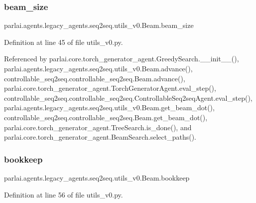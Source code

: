 \subsubsection{\texorpdfstring{beam\+\_\+size}{beam\_size}}
{\footnotesize\ttfamily parlai.\+agents.\+legacy\+\_\+agents.\+seq2seq.\+utils\+\_\+v0.\+Beam.\+beam\+\_\+size}



Definition at line 45 of file utils\+\_\+v0.\+py.



Referenced by parlai.\+core.\+torch\+\_\+generator\+\_\+agent.\+Greedy\+Search.\+\_\+\+\_\+init\+\_\+\+\_\+(), parlai.\+agents.\+legacy\+\_\+agents.\+seq2seq.\+utils\+\_\+v0.\+Beam.\+advance(), controllable\+\_\+seq2seq.\+controllable\+\_\+seq2seq.\+Beam.\+advance(), parlai.\+core.\+torch\+\_\+generator\+\_\+agent.\+Torch\+Generator\+Agent.\+eval\+\_\+step(), controllable\+\_\+seq2seq.\+controllable\+\_\+seq2seq.\+Controllable\+Seq2seq\+Agent.\+eval\+\_\+step(), parlai.\+agents.\+legacy\+\_\+agents.\+seq2seq.\+utils\+\_\+v0.\+Beam.\+get\+\_\+beam\+\_\+dot(), controllable\+\_\+seq2seq.\+controllable\+\_\+seq2seq.\+Beam.\+get\+\_\+beam\+\_\+dot(), parlai.\+core.\+torch\+\_\+generator\+\_\+agent.\+Tree\+Search.\+is\+\_\+done(), and parlai.\+core.\+torch\+\_\+generator\+\_\+agent.\+Beam\+Search.\+select\+\_\+paths().

\mbox{\label{classparlai_1_1agents_1_1legacy__agents_1_1seq2seq_1_1utils__v0_1_1Beam_a660602181552d0ef501cb99b68d790f3}} 
\subsubsection{\texorpdfstring{bookkeep}{bookkeep}}
{\footnotesize\ttfamily parlai.\+agents.\+legacy\+\_\+agents.\+seq2seq.\+utils\+\_\+v0.\+Beam.\+bookkeep}



Definition at line 56 of file utils\+\_\+v0.\+py.



